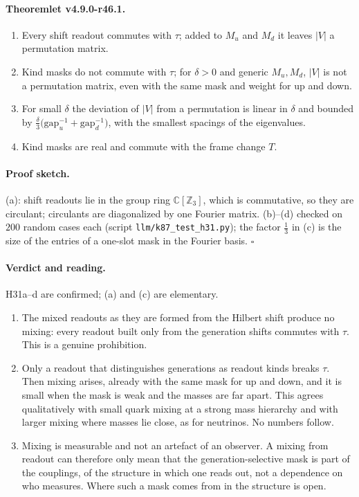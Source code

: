 \paragraph{Theoremlet v4.9.0-r46.1.}
\begin{enumerate}[leftmargin=2em]
\item[(a)] Every shift readout commutes with \(\tau\); added to \(M_u\) and \(M_d\) it leaves \(|V|\) a permutation matrix.
\item[(b)] Kind masks do not commute with \(\tau\); for \(\delta>0\) and generic \(M_u,M_d\), \(|V|\) is not a permutation matrix, even with the same
mask and weight for up and down.
\item[(c)] For small \(\delta\) the deviation of \(|V|\) from a permutation is linear in \(\delta\) and bounded by
\(\tfrac{\delta}{3}\bigl(\mathrm{gap}_u^{-1}+\mathrm{gap}_d^{-1}\bigr)\), with the smallest spacings of the eigenvalues.
\item[(d)] Kind masks are real and commute with the frame change \(T\).
\end{enumerate}

\paragraph{Proof sketch.}
(a): shift readouts lie in the group ring \(\mathbb C[\mathbb Z_3]\), which is commutative, so they are circulant; circulants are diagonalized by
one Fourier matrix.  (b)--(d) checked on \(200\) random cases each (script \texttt{llm/k87\_test\_h31.py}); the factor \(\tfrac13\) in (c) is the
size of the entries of a one-slot mask in the Fourier basis.  \(\square\)

\paragraph{Verdict and reading.}
H31a--d are confirmed; (a) and (c) are elementary.
\begin{enumerate}[leftmargin=2em]
\item The mixed readouts as they are formed from the Hilbert shift produce no mixing: every readout built only from the generation shifts
commutes with \(\tau\).  This is a genuine prohibition.
\item Only a readout that distinguishes generations as readout kinds breaks \(\tau\).  Then mixing arises, already with the same mask for up and
down, and it is small when the mask is weak and the masses are far apart.  This agrees qualitatively with small quark mixing at a strong mass
hierarchy and with larger mixing where masses lie close, as for neutrinos.  No numbers follow.
\item Mixing is measurable and not an artefact of an observer.  A mixing from readout can therefore only mean that the generation-selective
mask is part of the couplings, of the structure in which one reads out, not a dependence on who measures.  Where such a mask comes from in the
structure is open.
\end{enumerate}

